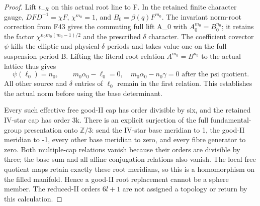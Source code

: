 \begin{proof}
Lift \(t_{-R}\) on this actual root line to F. In the retained finite
character gauge, \(DFD^{-1}=\chi F\), \(\chi^{m_0}=1\), and
\(B_0=\beta(q)F^{m_0}\). The invariant norm-root correction from F43 gives
the commuting full lift A\_0 with \(A_0^{m_0}=B_0^{n_0}\); it retains the
factor \(\chi^{n_0m_0(m_0-1)/2}\) and the prescribed \(\delta\) character.
The coefficient covector \(\psi\) kills the elliptic and physical-\(\delta\)
periods and takes value one on the full suspension period B. Lifting
the literal root relation \(A^{m_0}=B^{n_0}\) to the actual lattice thus
gives
\[
 \psi(\ell_0)=n_0,\qquad
          m_0\alpha_0-\ell_0=0,
          \quad m_0\alpha_0-n_0\gamma=0
                       \text{ after the psi quotient}. \tag{OT.31}
\]
All other source and \(\delta\) entries of \(\ell_0\) remain in the first
relation. This establishes the actual norm before using the base
determinant.

Every such effective free good-II cap has order divisible by six, and
the retained IV-star cap has order 3k. There is an explicit surjection
of the full fundamental-group presentation onto \(\mathbb Z/3\): send the
IV-star base meridian to 1, the good-II meridian to -1, every other
base meridian to zero, and every fibre generator to zero. Both
multiple-cap relations vanish because their orders are divisible by
three; the base sum and all affine conjugation relations also vanish.
The local free quotient maps retain exactly these root meridians, so
this is a homomorphism on the filled manifold. Hence a good-II root
replacement cannot be a sphere member. The reduced-II orders
\(6l+1\) are not assigned a topology or return by this calculation.

\end{proof}
